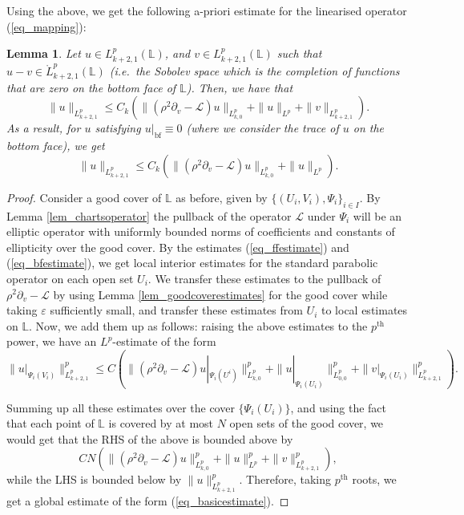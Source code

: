 \documentclass[10pt, a4paper]{article}
\theoremstyle{plain}%
\newtheorem{lem}[theorem]{Lemma}
\theoremstyle{definition}
\numberwithin{figure}{section}
\numberwithin{equation}{section}
\newcommand{\bL}{\mathbb{L}}
\newcommand{\pa}{\partial}
\newcommand{\ep}{\varepsilon}
\newcommand{\cL}{\mathcal{L}}
\begin{document}
Using the above, we get the following a-priori estimate for the linearised operator (\ref{eq_mapping}):
\begin{lem}\label{lem_globalestimate}
	Let $u\in L^p_{k+2,1}(\bL)$, and $v\in L^p_{k+2,1}(\bL)$ such that $u-v\in \mathring{L}^p_{k+2,1}(\bL)$ (i.e.\ the Sobolev space which is the completion of functions that are zero on the bottom face of $\bL$).  Then, we have that 
	\begin{equation}\label{eq_basicestimate}
		\|u\|_{L^p_{k+2,1}}
		\leq C_{k}\left(\|(\rho^2\pa_v-\cL)u\|_{L^p_{k,0}}+\|u\|_{L^p}+\|v\|_{L^p_{k+2,1}}\right).
	\end{equation}
 As a result, for $u$ satisfying $u|_{\textrm{bf}}\equiv 0$ (where we consider the trace of $u$ on the bottom face), we get \begin{equation}\label{eq_basicestimate2}
   	\|u\|_{L^p_{k+2,1}}
   	\leq C_{k}\left(\|(\rho^2\pa_v-\cL)u\|_{L^p_{k,0}}+\|u\|_{L^p}\right).
   \end{equation} 
\end{lem}
\begin{proof}
    Consider a good cover of $\bL$ as before, given by $\{(U_i,V_i),\Psi_i\}_{i\in I}$. By Lemma \ref{lem_chartsoperator} the pullback of the operator $\mathcal{L}$ under $\Psi_i$ will be an elliptic operator with uniformly bounded norms of coefficients and constants of ellipticity over the good cover. By the estimates (\ref{eq_ffestimate}) and (\ref{eq_bfestimate}), we get local interior estimates for the standard parabolic operator on each open set $U_i$. We transfer these estimates to the pullback of $\rho^2\pa_v-\mathcal{L}$ by using Lemma \ref{lem_goodcoverestimates} for the good cover while taking $\ep$ sufficiently small, and transfer these estimates from $U_i$ to local estimates on $\bL$. Now, we add them up as follows: raising the above estimates to the $p^{\mathrm{th}}$ power, we have an $L^p$-estimate of the form \[
\|u|_{\Psi_i(V_i)}\|^p_{L^p_{k+2,1}} \leq C\left(\|(\rho^2\partial_v - {\mathcal{L}})u|_{\Psi_i(U^i)}\|^p_{L^p_{k,0}} + \|u|_{\Psi_i(U_i)}\|^p_{L^p_{0,0}} + \|v|_{\Psi_i(U_i)}\|^p_{L^p_{k+2,1}}\right) .
\]

Summing up all these estimates over the cover $\{\Psi_i(U_i)\}$, and using the fact that each point of $\bL$ is covered by at most $N$ open sets of the good cover, we would get that the RHS of the above is bounded above by \[
CN(\|(\rho^2\partial_v - {\mathcal{L}})u\|^p_{L^p_{k,0}}+ \|u\|^p_{L^p}+\|v\|^p_{L^p_{k+2,1}}),
\]
while the LHS is bounded below by $\|u\|^p_{L^p_{k+2,1}}$. Therefore, taking $p^{\mathrm{th}}$ roots, we get a global estimate of the form (\ref{eq_basicestimate}).

\end{proof}
\end{document}
